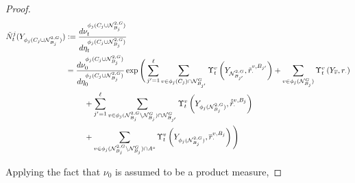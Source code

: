 \documentclass[12pt]{article}
\newcommand{\mc}{\mathcal}
\newcommand{\ov}{\overline}
\newcommand{\defeq}{:=}								%
\newcommand{\gneigh}[2]{\mc{N}^{#1}_{#2}}			%
\newcommand{\dgneigh}[2]{\mc{N}^{2,#1}_{#2}}		%
\newcommand{\cl}[1]{\ov{#1}}						%
\newcommand{\rate}{r}								%
\newcommand{\vind}[1]{_{#1}}						%
\newcommand{\vpara}[1]{^{#1}}						%
\newcommand{\stpara}[1]{_{#1}}						%
\newcommand{\tpara}[1]{_{#1}}						%
\newcommand{\psize}{\ell}							%
\newcommand{\Xg}{Y}									%
\newcommand{\brate}{\alt{\rate}}					%
\newcommand{\inte}[1]{{#1}^\mathrm{o}}				%
\newcommand{\alt}[1]{\tilde{#1}}					%
\newcommand{\mm}{\nu}								%
\newcommand{\bgrate}{\ov{\rate}}					%
\newcommand{\bcrate}{\hat{\brate}}					%
\newcommand{\mmm}{\eta}								%
\newcommand{\ds}{\Upsilon}							%
\newcommand{\denseph}{\alt{N}}						%
\newcommand{\jpara}[1]{^{#1}}						%
\newcommand{\vjpara}[2]{^{#1,#2}}					%
\begin{document}
\begin{proof}
\begin{align*}
\denseph\jpara{j}\tpara{t}(\Xg\vind{\phi_j(C_j\cup \dgneigh{G}{B_j})}) &\defeq \frac{d\mm\vpara{\phi_j(C_j\cup \dgneigh{G}{B_j})}\tpara{t}}{d\mmm\vpara{\phi_j(C_j\cup \dgneigh{G}{B_j})}\tpara{t}}\\
&= \frac{d\mm\vpara{\phi_j(C_j\cup \dgneigh{G}{B_j})}\tpara{0}}{d\mmm\vpara{\phi_j(C_j\cup \dgneigh{G}{B_j})}\tpara{0}}\exp\Bigg(\sum_{j' = 1}^{\psize}\sum_{v \in \phi_j(C_j)\cap\gneigh{G}{B_{j'}}} \ds\vpara{v}\tpara{t}\left(\Xg\vind{\dgneigh{G}{B_{j'}}},\brate\vjpara{v}{B_{j'}}\stpara{\cdot}\right) + \sum_{v \in \phi_j(\gneigh{G}{B_j})} \ds\vpara{v}\tpara{t}\left(\Xg\vind{\cl{v}},\rate\stpara{\cdot}\right)\\
&\hspace{24pt} + \sum_{j'=1}^\psize \sum_{v \in \phi_j(\dgneigh{G}{B_j}\setminus\gneigh{G}{B_j})\cap \gneigh{G}{B_{j'}}} \ds\vpara{v}\tpara{t}\left(\Xg\vind{\phi_j(\dgneigh{G}{B_j})},\bcrate\vjpara{v}{B_j}\stpara{\cdot}\right)\\
&\hspace{24 pt} + \sum_{v \in \phi_j(\dgneigh{G}{B_j}\setminus\gneigh{G}{B_j})\cap\inte{A}} \ds\vpara{v}\tpara{t}\left(\Xg\vind{\phi_j(\dgneigh{G}{B_j})},\bgrate\vjpara{v}{B_j}\stpara{\cdot}\right)\Bigg)
\end{align*}

Applying the fact that \(\mm\tpara{0}\) is assumed to be a product measure,


\end{proof}
\end{document}
